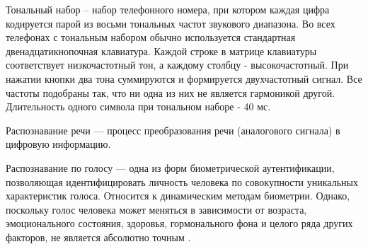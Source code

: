 Тональный набор -- набор телефонного номера, при котором каждая цифра кодируется
парой из восьми тональных частот звукового диапазона. Во всех телефонах с
тональным набором обычно используется стандартная двенадцатикнопочная клавиатура.
Каждой строке в матрице клавиатуры соответствует низкочастотный тон, а каждому
столбцу - высокочастотный. При нажатии кнопки два тона суммируются и формируется
двухчастотный сигнал. Все частоты подобраны так, что ни одна из них не является
гармоникой другой. Длительность одного символа при тональном наборе - 40 мс.~\cite{dtmf}

Распознавание речи — процесс преобразования речи (аналогового сигнала) в цифровую информацию.

Распознавание по голосу — одна из форм биометрической аутентификации, позволяющая
идентифицировать личность человека по совокупности уникальных характеристик голоса.
Относится к динамическим методам биометрии. Однако, поскольку голос человека может
меняться в зависимости от возраста, эмоционального состояния, здоровья,
гормонального фона и целого ряда других факторов, не является абсолютно точным
\cite{recognize_voice}.
